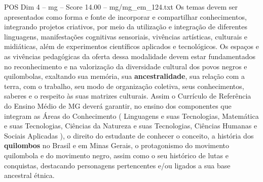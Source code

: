 \begin{textsample}{POS Dim 4 – mg – Score 14.00 – mg/mg\_em\_124.txt}
Os temas devem ser apresentados como forma e fonte de incorporar e compartilhar conhecimentos, integrando projetos criativos, por meio da utilização e integração de diferentes linguagens, manifestações cognitivas sensoriais, vivências artísticas, culturais e midiáticas, além de experimentos científicos aplicados e tecnológicos.
Os espaços e as vivências pedagógicas da oferta dessa modalidade devem estar fundamentados no reconhecimento e na valorização da diversidade cultural dos povos negros e quilombolas, exaltando sua memória, sua \textbf{ancestralidade}, sua relação com a terra, com o trabalho, seu modo de organização coletiva, seus conhecimentos, saberes e o respeito às suas matrizes culturais.
Assim o Currículo de Referência do Ensino Médio de MG deverá garantir, no ensino dos componentes que integram as Áreas do Conhecimento ( Linguagens e suas Tecnologias, Matemática e suas Tecnologias, Ciências da Natureza e suas Tecnologias, Ciências Humanas e Sociais Aplicadas ), o direito do estudante de conhecer o conceito, a história dos \textbf{quilombos} no Brasil e em Minas Gerais, o protagonismo do movimento quilombola e do movimento negro, assim como o seu histórico de lutas e conquistas, destacando personagens pertencentes e/ou ligados a sua base ancestral étnica.

\end{textsample}
